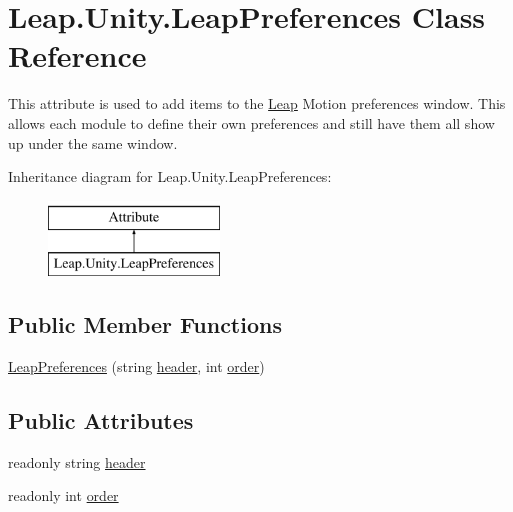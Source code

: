 \hypertarget{class_leap_1_1_unity_1_1_leap_preferences}{}\section{Leap.\+Unity.\+Leap\+Preferences Class Reference}
\label{class_leap_1_1_unity_1_1_leap_preferences}


This attribute is used to add items to the \mbox{\hyperlink{namespace_leap_1_1_unity_1_1_leap}{Leap}} Motion preferences window. This allows each module to define their own preferences and still have them all show up under the same window.  


Inheritance diagram for Leap.\+Unity.\+Leap\+Preferences\+:\begin{figure}[H]
\begin{center}
\leavevmode
\includegraphics[height=2.000000cm]{class_leap_1_1_unity_1_1_leap_preferences}
\end{center}
\end{figure}
\subsection*{Public Member Functions}
\begin{DoxyCompactItemize}
\item 
\mbox{\hyperlink{class_leap_1_1_unity_1_1_leap_preferences_a674e95b66eac493a3445f06e327ee646}{Leap\+Preferences}} (string \mbox{\hyperlink{class_leap_1_1_unity_1_1_leap_preferences_a325204caecdc471866bf089231b597fa}{header}}, int \mbox{\hyperlink{class_leap_1_1_unity_1_1_leap_preferences_a68d94071daff1ece9234af8027594f89}{order}})
\end{DoxyCompactItemize}
\subsection*{Public Attributes}
\begin{DoxyCompactItemize}
\item 
readonly string \mbox{\hyperlink{class_leap_1_1_unity_1_1_leap_preferences_a325204caecdc471866bf089231b597fa}{header}}
\item 
readonly int \mbox{\hyperlink{class_leap_1_1_unity_1_1_leap_preferences_a68d94071daff1ece9234af8027594f89}{order}}
\end{DoxyCompactItemize}



